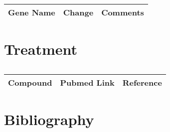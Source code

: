 \begin{table}[H]\centering
  \caption {\cite{key400}}
	\begin{tabular}{p{1cm}p{4cm}p{3cm}}
		Gene Name & Change & Comments\\
		\hline
 
		\hline
	\end{tabular}
\end{table}

\section{Treatment}

\begin{table}[H]\centering
 \caption {\cite{key470}\cite{key400}}
	\begin{tabular}{p{1cm}p{4cm}p{3cm}}
	Compound & Pubmed Link & Reference\\
		\hline
	\hline
	\end{tabular}
\end{table}



\section{Bibliography}

